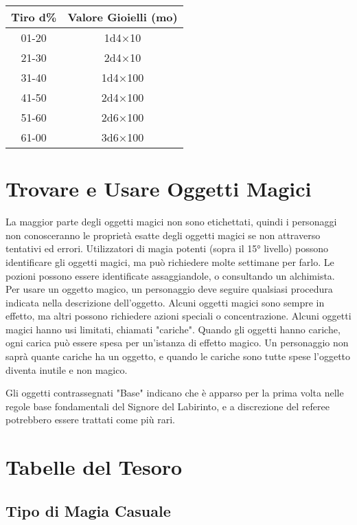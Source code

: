 \documentclass{article}
\begin{document}
\begin{multicols}{2}
\begin{table}[h]
\centering
\begin{tabular}{|c|c|}
\hline
\textbf{Tiro d\%} & \textbf{Valore Gioielli (mo)} \\
\hline
01-20 & 1d4×10 \\
21-30 & 2d4×10 \\
31-40 & 1d4×100 \\
41-50 & 2d4×100 \\
51-60 & 2d6×100 \\
61-00 & 3d6×100 \\
\hline
\end{tabular}

\end{table}

\section{Trovare e Usare Oggetti Magici}

La maggior parte degli oggetti magici non sono etichettati, quindi i personaggi non conosceranno le proprietà esatte degli oggetti magici se non attraverso tentativi ed errori. Utilizzatori di magia potenti (sopra il 15° livello) possono identificare gli oggetti magici, ma può richiedere molte settimane per farlo. Le pozioni possono essere identificate assaggiandole, o consultando un alchimista. Per usare un oggetto magico, un personaggio deve seguire qualsiasi procedura indicata nella descrizione dell'oggetto. Alcuni oggetti magici sono sempre in effetto, ma altri possono richiedere azioni speciali o concentrazione. Alcuni oggetti magici hanno usi limitati, chiamati "cariche". Quando gli oggetti hanno cariche, ogni carica può essere spesa per un'istanza di effetto magico. Un personaggio non saprà quante cariche ha un oggetto, e quando le cariche sono tutte spese l'oggetto diventa inutile e non magico.

Gli oggetti contrassegnati "Base" indicano che è apparso per la prima volta nelle regole base fondamentali del Signore del Labirinto, e a discrezione del referee potrebbero essere trattati come più rari.

\section{Tabelle del Tesoro}

\subsection{Tipo di Magia Casuale}


\end{multicols}
\end{document}
